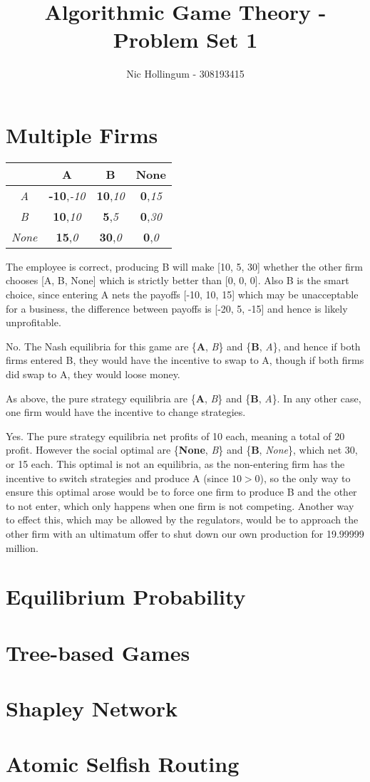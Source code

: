 \documentclass{article}
\author{Nic Hollingum - 308193415}
\title{Algorithmic Game Theory - Problem Set 1}
\begin{document}
\maketitle

\section {Multiple Firms}
\begin{center}
\begin{tabular}{ | c | c | c | c |}
\hline
 & 				{\bf A} & 				{\bf B} & 			{\bf None} \\ \hline
{\em A} &		{\bf -10},{\em -10} &	{\bf 10},{\em 10} &	{\bf 0},{\em 15} \\ \hline
{\em B} &		{\bf 10},{\em 10} &		{\bf 5},{\em 5} &	{\bf 0},{\em 30} \\ \hline
{\em None} &	{\bf 15},{\em 0} &		{\bf 30},{\em 0} &	{\bf 0},{\em 0} \\ \hline
\end{tabular}
\end{center}

The employee is correct, producing B will make [10, 5, 30] whether the other firm chooses [A, B, None] which is strictly better than [0, 0, 0].
Also B is the smart choice, since entering A nets the payoffs [-10, 10, 15] which may be unacceptable for a business, the difference between payoffs is [-20, 5, -15] and hence is likely unprofitable.

No.
The Nash equilibria for this game are \{{\bf A}, {\em B}\} and \{{\bf B}, {\em A}\}, and hence if both firms entered B, they would have the incentive to swap to A, though if both firms did swap to A, they would loose money.

As above, the pure strategy equilibria are \{{\bf A}, {\em B}\} and \{{\bf B}, {\em A}\}.
In any other case, one firm would have the incentive to change strategies.

Yes.
The pure strategy equilibria net profits of 10 each, meaning a total of 20 profit.
However the social optimal are \{{\bf None}, {\em B}\} and \{{\bf B}, {\em None}\}, which net 30, or 15 each.
This optimal is not an equilibria, as the non-entering firm has the incentive to switch strategies and produce A (since $10 > 0$), so the only way to ensure this optimal arose would be to force one firm to produce B and the other to not enter, which only happens when one firm is not competing.
Another way to effect this, which may be allowed by the regulators, would be to approach the other firm with an ultimatum offer to shut down our own production for 19.99999 million.

\section {Equilibrium Probability}
\section {Tree-based Games}
\section {Shapley Network}
\section {Atomic Selfish Routing}
\end{document}
